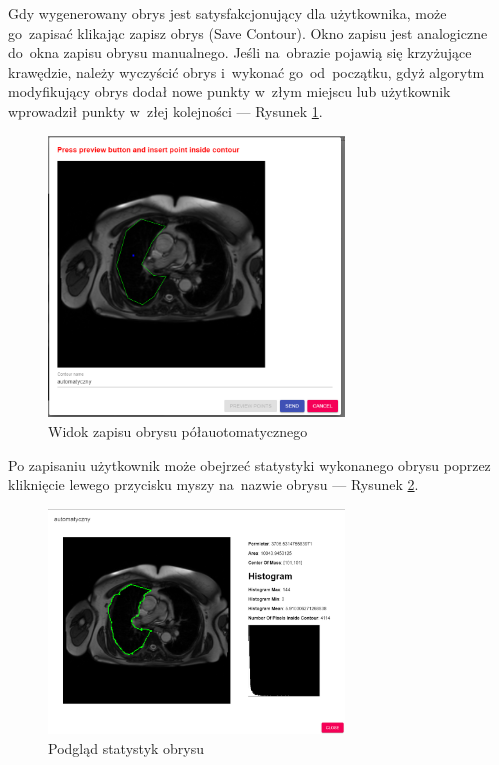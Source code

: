 \documentclass[a4paper,11pt,twoside,openright]{report}
\theoremstyle{definition}
\begin{document}
\begin{enumerate}
Gdy wygenerowany obrys jest satysfakcjonujący dla użytkownika, może go~zapisać
klikając zapisz obrys (Save Contour). Okno zapisu jest analogiczne do~okna zapisu
obrysu manualnego. Jeśli na~obrazie pojawią się krzyżujące krawędzie, należy
wyczyścić obrys i~wykonać go~od~początku, gdyż algorytm modyfikujący obrys dodał
nowe punkty w~złym miejscu lub użytkownik wprowadził punkty w~złej kolejności
--- Rysunek \ref{fig:14}.

\pagebreak

\begin{figure}[h!]
	\center
	\includegraphics[width=0.7\textwidth]{14}
	\caption{Widok zapisu obrysu półauotomatycznego}
    	\label{fig:14}
\end{figure}

Po zapisaniu użytkownik może obejrzeć statystyki wykonanego obrysu poprzez
kliknięcie lewego przycisku myszy na~nazwie obrysu --- Rysunek \ref{fig:15}.

\begin{figure}[h!]
	\center
	\includegraphics[width=0.7\textwidth]{15}
	\caption{Podgląd statystyk obrysu}
    	\label{fig:15}
\end{figure}


\end{enumerate}
\end{document}
